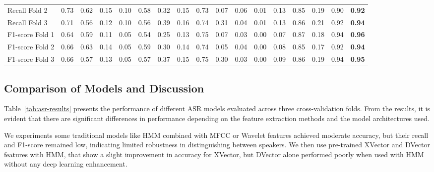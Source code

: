 \documentclass[conference]{IEEEtran}
\begin{document}
\begin{table}[htbp]
{\begin{tabular}{|l|c|c|c|c|c|c|c|c|c|c|c|c|c|c|c|c|}
            Recall Fold 2          & 0.73     & 0.62     & 0.15        & 0.10     & 0.58     & 0.32     & 0.15        & 0.73     & 0.07      & 0.06         & 0.01      & 0.13      & 0.85          & 0.19             & 0.90          & \textbf{0.92}          \\
            Recall Fold 3          & 0.71     & 0.56     & 0.12        & 0.10     & 0.56     & 0.39     & 0.16        & 0.74     & 0.31      & 0.04         & 0.01      & 0.13      & 0.86          & 0.21             & 0.92          & \textbf{0.94}          \\
            \hline
            F1-score Fold 1        & 0.64     & 0.59     & 0.11        & 0.05     & 0.54     & 0.25     & 0.13        & 0.75     & 0.07      & 0.03         & 0.00      & 0.07      & 0.87          & 0.18             & 0.94          & \textbf{0.96}          \\
            F1-score Fold 2        & 0.66     & 0.63     & 0.14        & 0.05     & 0.59     & 0.30     & 0.14        & 0.74     & 0.05      & 0.04         & 0.00      & 0.08      & 0.85          & 0.17             & 0.92          & \textbf{0.94}          \\
            F1-score Fold 3        & 0.66     & 0.57     & 0.13        & 0.05     & 0.57     & 0.37     & 0.15        & 0.75     & 0.30      & 0.03         & 0.00      & 0.09      & 0.86          & 0.19             & 0.94          & \textbf{0.95}          \\
            \hline
        \end{tabular}
    }
\end{table}
\subsection{Comparison of Models and Discussion}

Table~\ref{tab:asr-results} presents the performance of different ASR models evaluated across three cross-validation folds. From the results, it is evident that there are significant differences in performance depending on the feature extraction methods and the model architectures used.

We experiments some traditional models like HMM combined with MFCC or Wavelet features achieved moderate accuracy, but their recall and F1-score remained low, indicating limited robustness in distinguishing between speakers. We then use pre-trained XVector and DVector features with HMM, that show a slight improvement in accuracy for XVector, but DVector alone performed poorly when used with HMM without any deep learning enhancement.
\end{document}
